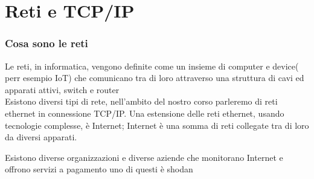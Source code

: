 \chapter{Reti e TCP/IP}	 %

\subsection{Cosa sono le reti}
Le reti, in informatica, vengono definite come un insieme di computer e device( perr esempio IoT)  che comunicano tra di loro attraverso una struttura di cavi ed apparati attivi, switch e router\\
Esistono diversi tipi di rete, nell'ambito del nostro corso parleremo di reti ethernet in connessione TCP/IP.
Una estensione delle reti ethernet, usando tecnologie complesse, è Internet; Internet è una somma di reti collegate tra di loro da diversi apparati.

Esistono diverse organizzazioni e diverse aziende che monitorano Internet e offrono servizi a pagamento uno di questi è shodan \cite{shodandeveloper} \cite{shodan}


